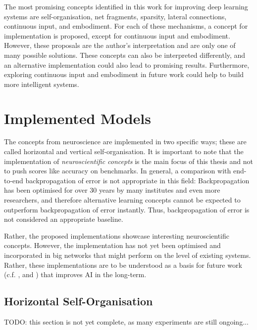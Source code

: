 The most promising concepts identified in this work for improving deep learning systems are self-organisation, net fragments, sparsity, lateral connections, continuous input, and embodiment. For each of these mechanisms, a concept for implementation is proposed, except for continuous input and embodiment. However, these proposals are the author's interpretation and are only one of many possible solutions. These concepts can also be interpreted differently, and an alternative implementation could also lead to promising results. Furthermore, exploring continuous input and embodiment in future work could help to build more intelligent systems. 


\section{Implemented Models}
The concepts from neuroscience are implemented in two specific ways; these are called horizontal and vertical self-organisation. It is important to note that the implementation of \emph{neuroscientific concepts} is the main focus of this thesis and not to push scores like accuracy on benchmarks. In general, a comparison with end-to-end backpropagation of error is not appropriate in this field: Backpropagation has been optimised for over 30 years by many institutes and even more researchers, and therefore alternative learning concepts cannot be expected to outperform backpropagation of error instantly. Thus, backpropagation of error is not considered an appropriate baseline.

Rather, the proposed implementations showcase interesting neuroscientific concepts. However, the implementation has not yet been optimised and incorporated in big networks that might perform on the level of existing systems. Rather, these implementations are to be understood as a basis for future work (c.f. ,  and ) that improves AI in the long-term.


\subsection{Horizontal Self-Organisation}
TODO: this section is not yet complete, as many experiments are still ongoing...

